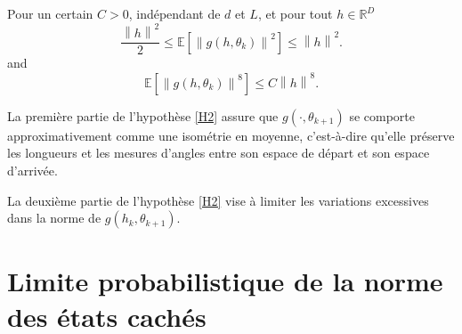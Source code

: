 \begin{assumption}\label{H2}
    Pour un certain $ C > 0 $, indépendant de $ d $ et $ L $, et pour tout $ h \in \mathbb{R}^D  $ 
    \[
        \frac{\left\| h \right\| ^2}{2 } \leq  \mathbb{E }[ \left\|  g(h, \theta _ k ) \right\| ^2 ] \leq \left\| h \right\| ^2
    .\]
    and
    \[
        \mathbb{E } [\left\| g(h, \theta _k)  \right\| ^8 ]\leq C \left\| h  \right\| ^8
    .\]
\end{assumption}
\begin{note}
    La première partie de l'hypothèse \ref{H2} assure que $g(\cdot, \theta_{k+1})$ se comporte approximativement comme une isométrie en moyenne, c'est-à-dire qu'elle préserve les longueurs et les mesures d'angles entre son espace de départ et son espace d'arrivée.

    La deuxième partie de l'hypothèse \ref{H2} vise à limiter les variations excessives dans la norme de $g(h_k, \theta_{k+1})$.
\end{note}



\section{Limite probabilistique de la norme des états cachés}

